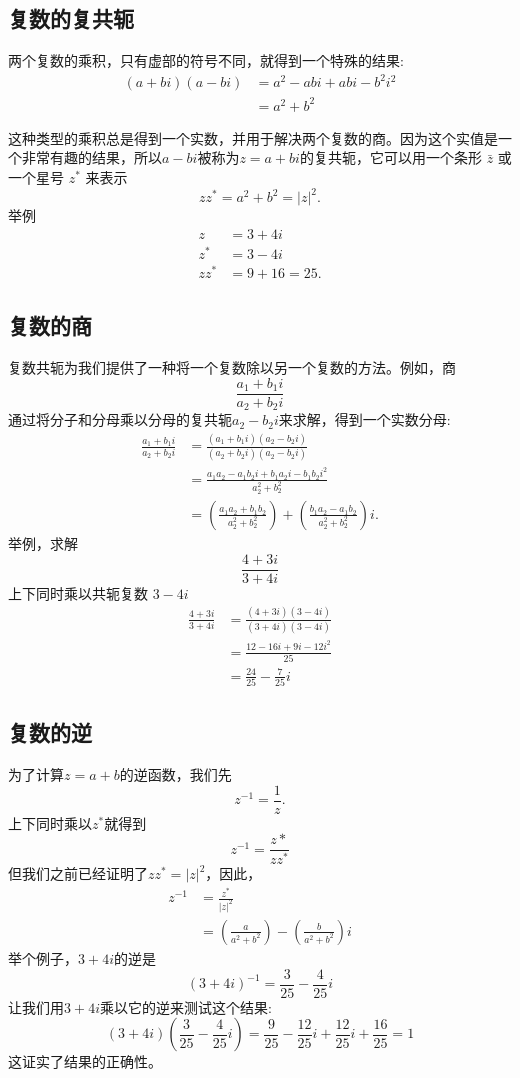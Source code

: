 \subsection{复数的复共轭}
两个复数的乘积，只有虚部的符号不同，就得到一个特殊的结果:
$$
\begin{aligned}
(a+b i)(a-b i) & =a^{2}-a b i+a b i-b^{2} i^{2} \\
& =a^{2}+b^{2}
\end{aligned}
$$

这种类型的乘积总是得到一个实数，并用于解决两个复数的商。因为这个实值是一个非常有趣的结果，所以$a-b i$被称为$z=a+b i$的复共轭，它可以用一个条形 $\bar{z}$ 或一个星号 $z^{*}$ 来表示
$$
z z^{*}=a^{2}+b^{2}=|z|^{2} .
$$
举例
$$
\begin{aligned}
z & =3+4 i \\
z^{*} & =3-4 i \\
z z^{*} & =9+16=25 .
\end{aligned}
$$

\subsection{复数的商}
复数共轭为我们提供了一种将一个复数除以另一个复数的方法。例如，商
$$
\frac{a_{1}+b_{1} i}{a_{2}+b_{2} i}
$$
通过将分子和分母乘以分母的复共轭$a_{2}-b_{2} i$来求解，得到一个实数分母:
$$
\begin{aligned}
\frac{a_{1}+b_{1} i}{a_{2}+b_{2} i} & =\frac{\left(a_{1}+b_{1} i\right)\left(a_{2}-b_{2} i\right)}{\left(a_{2}+b_{2} i\right)\left(a_{2}-b_{2} i\right)} \\
& =\frac{a_{1} a_{2}-a_{1} b_{2} i+b_{1} a_{2} i-b_{1} b_{2} i^{2}}{a_{2}^{2}+b_{2}^{2}} \\
& =\left(\frac{a_{1} a_{2}+b_{1} b_{2}}{a_{2}^{2}+b_{2}^{2}}\right)+\left(\frac{b_{1} a_{2}-a_{1} b_{2}}{a_{2}^{2}+b_{2}^{2}}\right) i .
\end{aligned}
$$
举例，求解
$$
\frac{4+3 i}{3+4 i}
$$
上下同时乘以共轭复数 $3-4i$
$$
\begin{aligned}
\frac{4+3 i}{3+4 i} & =\frac{(4+3 i)(3-4 i)}{(3+4 i)(3-4 i)} \\
& =\frac{12-16 i+9 i-12 i^{2}}{25} \\
& =\frac{24}{25}-\frac{7}{25} i
\end{aligned}
$$

\subsection{复数的逆}
为了计算$z=a+b$的逆函数，我们先
$$
z^{-1}=\frac{1}{z} .
$$
上下同时乘以$z^{*}$就得到
$$
z^{-1}=\frac{z *}{z z^{*}}
$$
但我们之前已经证明了$z z^{*}=|z|^{2}$，因此，
$$
\begin{aligned}
z^{-1} & =\frac{z^{*}}{|z|^{2}} \\
& =\left(\frac{a}{a^{2}+b^{2}}\right)-\left(\frac{b}{a^{2}+b^{2}}\right) i
\end{aligned}
$$
举个例子，$3+ 4i $的逆是
$$
(3+4 i)^{-1}=\frac{3}{25}-\frac{4}{25} i
$$
让我们用$3+4 i$乘以它的逆来测试这个结果:
$$
(3+4 i)\left(\frac{3}{25}-\frac{4}{25} i\right)=\frac{9}{25}-\frac{12}{25} i+\frac{12}{25} i+\frac{16}{25}=1
$$
这证实了结果的正确性。

